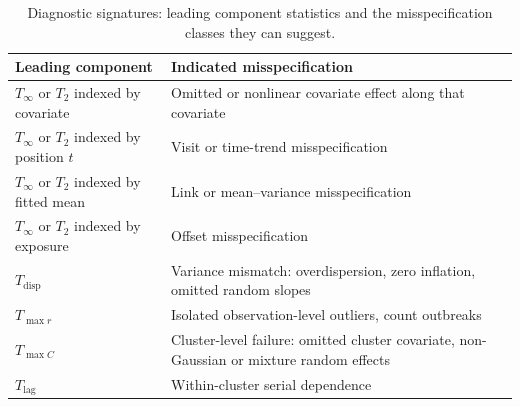 \begin{table}[htbp]
\small
\caption{Diagnostic signatures: leading component statistics and the misspecification
classes they can suggest.}
\label{tab:signature}
\begin{tabular*}{\textwidth}{@{}l@{\extracolsep{\fill}}l@{}}
\toprule
Leading component & Indicated misspecification \\
\midrule
$T_\infty$ or $T_2$ indexed by covariate & Omitted or nonlinear covariate effect along that covariate \\
$T_\infty$ or $T_2$ indexed by position $t$ & Visit or time-trend misspecification \\
$T_\infty$ or $T_2$ indexed by fitted mean & Link or mean--variance misspecification \\
$T_\infty$ or $T_2$ indexed by exposure & Offset misspecification \\
$T_{\mathrm{disp}}$ & Variance mismatch: overdispersion, zero inflation, omitted random slopes \\
$T_{\max r}$ & Isolated observation-level outliers, count outbreaks \\
$T_{\max C}$ & Cluster-level failure: omitted cluster covariate, non-Gaussian or mixture random effects \\
$T_{\mathrm{lag}}$ & Within-cluster serial dependence \\
\bottomrule
\end{tabular*}
\end{table}
